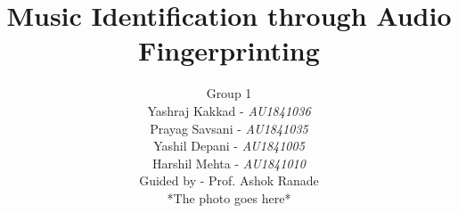 \documentclass[12pt, a4paper]{IEEEtran}
\begin{document}
\title{Music Identification through Audio Fingerprinting}

\author{
    \vspace{10mm}
    \huge
    Group 1 \\
    \vspace{3mm}
    \LARGE
    Yashraj Kakkad - \textit{AU1841036} \\ 
    Prayag Savsani - \textit{AU1841035} \\
    Yashil Depani - \textit{AU1841005} \\ 
    Harshil Mehta - \textit{AU1841010} \\
\vspace{3mm}
Guided by - Prof. Ashok Ranade \\
\null \vfill
*The photo goes here*
}


\end{document}
